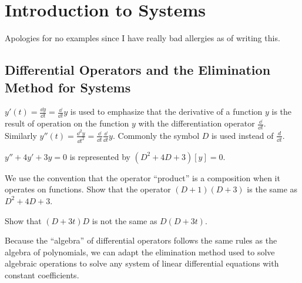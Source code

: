 \documentclass[../diffeq.tex]{subfiles}
\begin{document}
\chapter{Introduction to Systems}
Apologies for no examples since I have really bad allergies as of writing this.

\section{Differential Operators and the Elimination Method for Systems}
$y'(t)= \frac{\dd y}{\dd t}=\frac{\dd}{\dd t}y$ is used to emphasize that the derivative of a function $y$ is the result of operation on the function $y$ with the differentiation operator 
$\frac{\dd}{\dd t}$. Similarly $y''(t)=\frac{\dd^2 y}{\dd t^2}=\frac{\dd}{\dd t}\frac{\dd}{\dd t}y$. Commonly the symbol $D$ is used instead of $\frac{d}{\dd t}$.

$y''+4y'+3y=0$ is represented by $(D^2+4D+3)[y]=0$.

We use the convention that the operator ``product'' is a composition when it operates on functions.
\ex Show that the operator $(D+1)(D+3)$ is the same as $D^2+4D+3$.

\ex Show that $(D+3t)D$ is not the same as $D(D+3t)$.

Because the ``algebra'' of differential operators follows the same rules as the algebra of polynomials, we can adapt the elimination method used to solve algebraic operations to solve any system of 
linear differential equations with constant coefficients.
\end{document}
